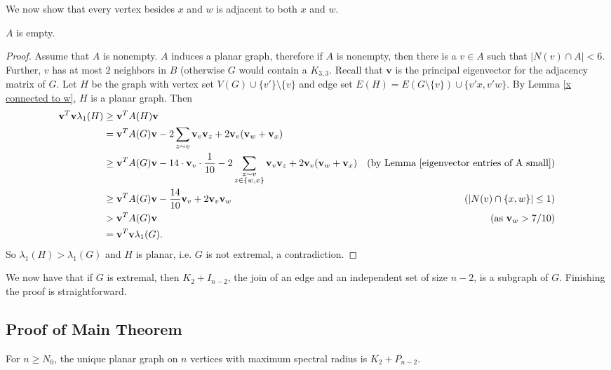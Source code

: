 We now show that every vertex besides $x$ and $w$ is adjacent to both $x$ and $w$.

\begin{lemma}\label{A empty}
$A$ is empty.
\end{lemma}

\begin{proof}
Assume that $A$ is nonempty. $A$ induces a planar graph, therefore if $A$ is nonempty, then there is a $v\in A$ such that $|N(v)\cap A| < 6$. Further, $v$ has at most $2$ neighbors in $B$ (otherwise $G$ would contain a $K_{3,3}$. Recall that $\textbf{v}$ is the principal eigenvector for the adjacency matrix of $G$. Let $H$ be the graph with vertex set $V(G) \cup \{v'\} \setminus \{v\}$ and edge set $E(H) = E(G\setminus\{v\}) \cup \{v'x, v'w\}$. By Lemma \ref{x connected to w}, $H$ is a planar graph. Then 
\begin{align*}
\textbf{v}^T \textbf{v}\lambda_1(H) &\geq \textbf{v}^T A(H) \textbf{v} & \\
& = \textbf{v}^T A(G) \textbf{v} - 2\sum_{z\sim v} \mathbf{v}_v\mathbf{v}_z + 2\mathbf{v}_v(\mathbf{v}_w+\mathbf{v}_x) & \\
& \geq \textbf{v}^T A(G) \textbf{v} - 14\cdot \mathbf{v}_v \cdot \frac{1}{10} - 2\sum_{\substack{z\sim v\\ z\in \{w,x\}}} \mathbf{v}_v\mathbf{v}_z + 2\mathbf{v}_v(\mathbf{v}_w+\mathbf{v}_x) & \mbox{(by Lemma \ref{eigenvector entries of A small})} \\
& \geq \textbf{v}^T A(G) \textbf{v} - \frac{14}{10}\mathbf{v}_v + 2\mathbf{v}_v\mathbf{v}_w & \mbox{($|N(v)\cap \{x,w\}| \leq 1$)} \\
& > \textbf{v}^T A(G) \textbf{v} & \mbox{(as $\mathbf{v}_w>7/10$)}\\
&= \textbf{v}^T\textbf{v} \lambda_1(G).
\end{align*}
So $\lambda_1(H) > \lambda_1(G)$ and $H$ is planar, i.e. $G$ is not extremal, a contradiction.
\end{proof}


We now have that if $G$ is extremal, then $K_2+I_{n-2}$, the join of an edge and an independent set of size $n-2$, is a subgraph of $G$. Finishing the proof is straightforward.


\subsection{Proof of Main Theorem}

\begin{theorem}
For $n\geq N_0$, the unique planar graph on $n$ vertices with maximum spectral radius is $K_{2} + P_{n-2}$.
\end{theorem}

